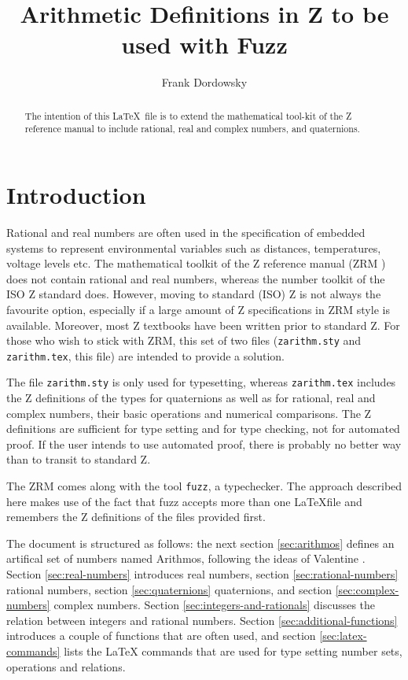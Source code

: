 \documentclass[12pt]{article}
\begin{document}
\title{Arithmetic Definitions in  Z to be used with Fuzz}

\author{Frank Dordowsky}

\maketitle

\begin{abstract}
  The intention of this \LaTeX\ file is to extend the mathematical
  tool-kit of the Z reference manual to include rational, real and
  complex numbers, and quaternions.
\end{abstract}


\section{Introduction}
\label{sec:intro}
Rational and real numbers are often used in the specification of
embedded systems to represent environmental variables such as
distances, temperatures, voltage levels etc. The mathematical toolkit
of the Z reference manual (ZRM \cite{Spivey1998}) does not contain
rational and real numbers, whereas the number toolkit of the ISO Z
standard does. However, moving to standard (ISO) Z \cite{ISO13568} is
not always the favourite option, especially if a large amount of Z
specifications in ZRM style is available. Moreover, most Z textbooks
have been written prior to standard Z. For those who wish to stick
with ZRM, this set of two files (\texttt{zarithm.sty} and
\texttt{zarithm.tex}, this file) are intended to provide a solution.

The file \texttt{zarithm.sty} is only used for typesetting, whereas
\texttt{zarithm.tex} includes the Z definitions of the types for
quaternions as well as for rational, real and complex numbers, their
basic operations and numerical comparisons. The Z definitions are
sufficient for type setting and for type checking, not for automated
proof. If the user intends to use automated proof, there is probably
no better way than to transit to standard Z.

The ZRM comes along with the tool \texttt{fuzz}, a typechecker. The
approach described here makes use of the fact that fuzz accepts more
than one \LaTeX file and remembers the Z definitions of the files
provided first.

The document is structured as follows: the next section
\ref{sec:arithmos} defines an artifical set of numbers named Arithmos,
following the ideas of Valentine \cite{Valentine2012}. Section
\ref{sec:real-numbers} introduces real numbers, section
\ref{sec:rational-numbers} rational numbers, section
\ref{sec:quaternions} quaternions, and section
\ref{sec:complex-numbers} complex numbers. Section
\ref{sec:integers-and-rationals} discusses the relation between
integers and rational numbers. Section \ref{sec:additional-functions}
introduces a couple of functions that are often used, and section
\ref{sec:latex-commands} lists the \LaTeX{} commands that are used for
type setting number sets, operations and relations.
%
\end{document}
